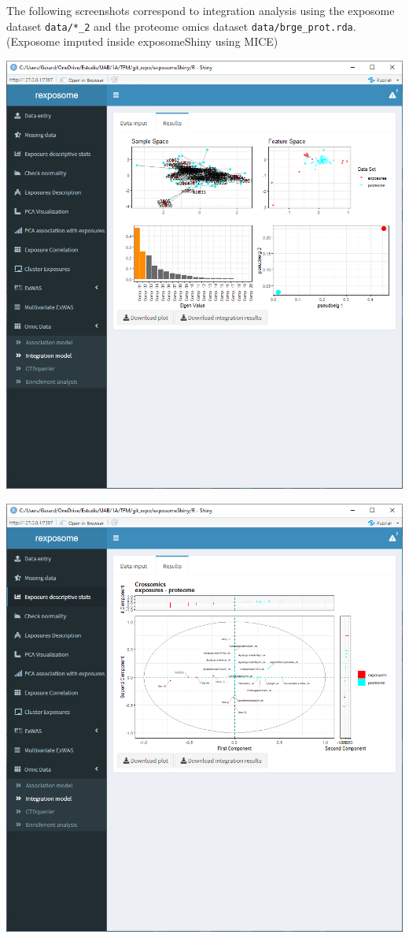 \documentclass[
]{book}
\begin{document}
The following screenshots correspond to integration analysis using the exposome dataset \texttt{data/*\_2} and the proteome omics dataset \texttt{data/brge\_prot.rda}. (Exposome imputed inside exposomeShiny using MICE)

\includegraphics{images/analysis12_1.png}

\includegraphics{images/analysis12_2.png}
\end{document}
